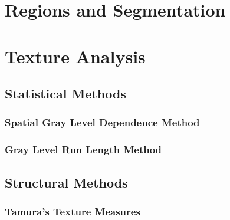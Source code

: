 \documentclass{article}
\begin{document}
\begin{multicols}{2}
\section{Regions and Segmentation}

\section{Texture Analysis}
\subsection{Statistical Methods}
\subsubsection{Spatial Gray Level Dependence Method}
\subsubsection{Gray Level Run Length Method}
\subsection{Structural Methods}
\subsubsection{Tamura's Texture Measures}





\end{multicols}
\end{document}
